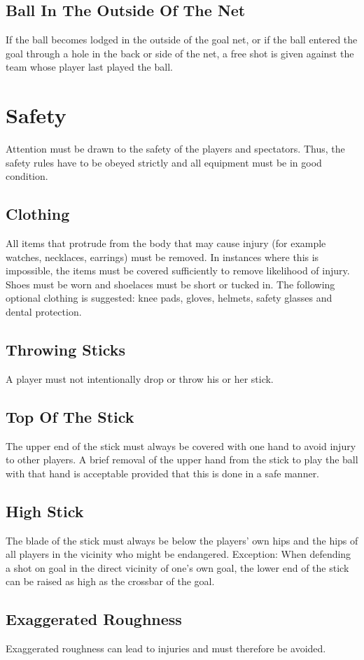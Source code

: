 \subsection{Ball In The Outside Of The Net}
If the ball becomes lodged in the outside of the goal net, or if the ball entered the goal through a hole in the back or side of the net, a free shot is given against the team whose player last played the ball.

\section{Safety}

Attention must be drawn to the safety of the players and spectators.
Thus, the safety rules have to be obeyed strictly and all equipment must be in good condition.

\subsection{Clothing \label{subsec:hockey_safety_clothing}}
All items that protrude from the body that may cause injury (for example watches, necklaces, earrings) must be removed.
In instances where this is impossible, the items must be covered sufficiently to remove likelihood of injury.
Shoes must be worn and shoelaces must be short or tucked in.
The following optional clothing is suggested: knee pads, gloves, helmets, safety glasses and dental protection.

\subsection{Throwing Sticks}
A player must not intentionally drop or throw his or her stick.

\subsection{Top Of The Stick}
The upper end of the stick must always be covered with one hand to avoid injury to other players.
A brief removal of the upper hand from the stick to play the ball with that hand is acceptable provided that this is done in a safe manner.

\subsection{High Stick \label{subsec:hockey_safety_stick}}
The blade of the stick must always be below the players' own hips and the hips of all players in the vicinity who might be endangered.
Exception: When defending a shot on goal in the direct vicinity of one's own goal, the lower end of the stick can be raised as high as the crossbar of the goal.

\subsection{Exaggerated Roughness}
Exaggerated roughness can lead to injuries and must therefore be avoided.
